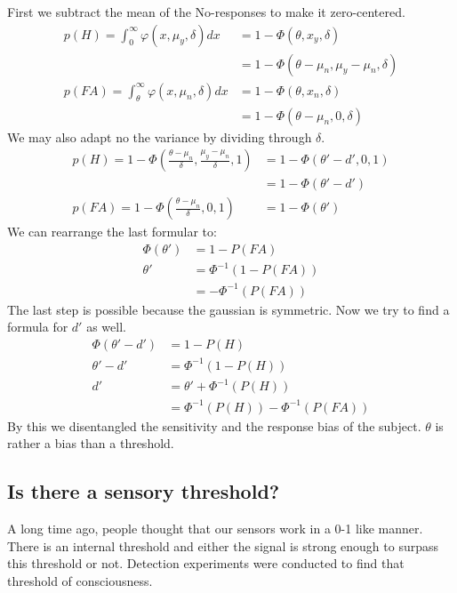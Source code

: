 \documentclass[../main/Notes.tex]{subfiles}
\begin{document}
\bigskip
First we subtract the mean of the No-responses to make it zero-centered. 
\begin{align*}
p(H) = \int_{0}^{\infty} \varphi \left( x,\mu_y,\delta \right)dx &= 1 - \Phi\left(\theta,x_y,\delta\right)\\
                                                                 &= 1 - \Phi\left(\theta-\mu_n,\mu_y-\mu_n,\delta \right)\\ 
p(FA) = \int_{\theta}^{\infty} \varphi \left( x,\mu_n,\delta \right)dx &= 1 - \Phi\left(\theta,x_n,\delta\right)\\
                                                                       &= 1 - \Phi\left(\theta-\mu_n,0,\delta \right)   
\end{align*}
We may also adapt no the variance by dividing through $\delta$.
\begin{align*}
p(H) = 1 - \Phi\left(\frac{\theta-\mu_n}{\delta},\frac{\mu_y-\mu_n}{\delta},1 \right) &= 1 - \Phi\left(\theta'-d',0,1\right)\\
                                                                                      &= 1 - \Phi\left(\theta'-d'\right)\\
p(FA) = 1 - \Phi\left(\frac{\theta-\mu_n}{\delta},0,1 \right) &= 1 - \Phi\left(\theta' \right) 
\end{align*}
We can rearrange the last formular to:
\begin{align*}
\Phi\left(\theta'\right) &= 1 - P(FA)\\
\theta'&=\Phi^{-1}\left(1-P(FA)\right)\\
&=-\Phi^{-1}\left(P(FA)\right)
\end{align*}
The last step is possible because the gaussian is symmetric. Now we try to find a formula for $d'$ as well. 
\begin{align*}
\Phi\left(\theta'-d'\right) &= 1 - P(H)\\
\theta'-d'&=\Phi^{-1}\left(1-P(H)\right)\\
d' &= \theta'+\Phi^{-1}\left(P(H)\right)\\
   &= \Phi^{-1}\left(P(H)\right)-\Phi^{-1}\left(P(FA)\right)
\end{align*}
By this we disentangled the sensitivity and the response bias of the subject. $\theta$ is rather a bias than a threshold.


\subsection{Is there a sensory threshold?}
A long time ago, people thought that our sensors work in a 0-1 like manner. There is an internal threshold and either the signal is strong enough to surpass this threshold or not. Detection experiments were conducted to find that threshold of consciousness.
\end{document}

